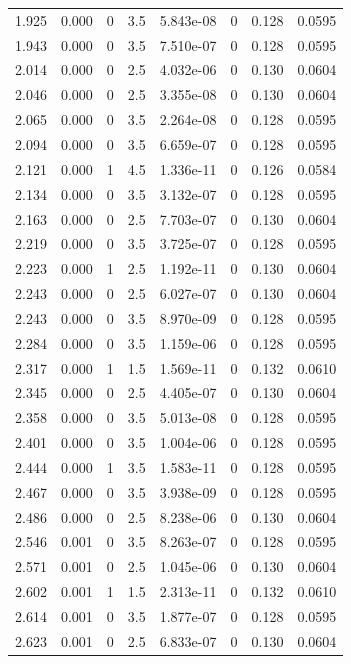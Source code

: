 \documentclass[preview]{standalone}
\begin{document}
{{{\begin{tabular}{L{1.2cm}C{1.2cm} C{0.3cm}C{0.5cm} C{1.4cm}C{1.4cm} C{1.4cm}C{1.4cm}}
  1.925  &  0.000  & 0     & 3.5 &  5.843e-08  & 0  & 0.128 &  0.0595   \\ 
  1.943  &  0.000  & 0     & 3.5 &  7.510e-07  & 0  & 0.128 &  0.0595   \\ 
  2.014  &  0.000  & 0     & 2.5 &  4.032e-06  & 0  & 0.130 &  0.0604   \\ 
  2.046  &  0.000  & 0     & 2.5 &  3.355e-08  & 0  & 0.130 &  0.0604   \\ 
  2.065  &  0.000  & 0     & 3.5 &  2.264e-08  & 0  & 0.128 &  0.0595   \\ 
  2.094  &  0.000  & 0     & 3.5 &  6.659e-07  & 0  & 0.128 &  0.0595   \\ 
  2.121  &  0.000  & 1     & 4.5 &  1.336e-11  & 0  & 0.126 &  0.0584   \\ 
  2.134  &  0.000  & 0     & 3.5 &  3.132e-07  & 0  & 0.128 &  0.0595   \\ 
  2.163  &  0.000  & 0     & 2.5 &  7.703e-07  & 0  & 0.130 &  0.0604   \\ 
  2.219  &  0.000  & 0     & 3.5 &  3.725e-07  & 0  & 0.128 &  0.0595   \\ 
  2.223  &  0.000  & 1     & 2.5 &  1.192e-11  & 0  & 0.130 &  0.0604   \\ 
  2.243  &  0.000  & 0     & 2.5 &  6.027e-07  & 0  & 0.130 &  0.0604   \\ 
  2.243  &  0.000  & 0     & 3.5 &  8.970e-09  & 0  & 0.128 &  0.0595   \\ 
  2.284  &  0.000  & 0     & 3.5 &  1.159e-06  & 0  & 0.128 &  0.0595   \\ 
  2.317  &  0.000  & 1     & 1.5 &  1.569e-11  & 0  & 0.132 &  0.0610   \\ 
  2.345  &  0.000  & 0     & 2.5 &  4.405e-07  & 0  & 0.130 &  0.0604   \\ 
  2.358  &  0.000  & 0     & 3.5 &  5.013e-08  & 0  & 0.128 &  0.0595   \\ 
  2.401  &  0.000  & 0     & 3.5 &  1.004e-06  & 0  & 0.128 &  0.0595   \\ 
  2.444  &  0.000  & 1     & 3.5 &  1.583e-11  & 0  & 0.128 &  0.0595   \\ 
  2.467  &  0.000  & 0     & 3.5 &  3.938e-09  & 0  & 0.128 &  0.0595   \\ 
  2.486  &  0.000  & 0     & 2.5 &  8.238e-06  & 0  & 0.130 &  0.0604   \\ 
  2.546  &  0.001  & 0     & 3.5 &  8.263e-07  & 0  & 0.128 &  0.0595   \\ 
  2.571  &  0.001  & 0     & 2.5 &  1.045e-06  & 0  & 0.130 &  0.0604   \\ 
  2.602  &  0.001  & 1     & 1.5 &  2.313e-11  & 0  & 0.132 &  0.0610   \\ 
  2.614  &  0.001  & 0     & 3.5 &  1.877e-07  & 0  & 0.128 &  0.0595   \\ 
  2.623  &  0.001  & 0     & 2.5 &  6.833e-07  & 0  & 0.130 &  0.0604   \\ 
\hline 
\end{tabular} 

}}}
\end{document}
